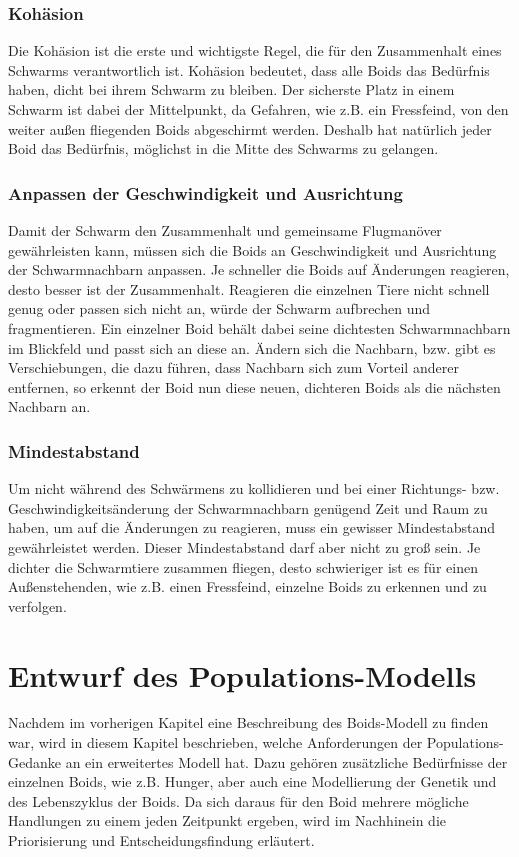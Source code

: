 \documentclass[draft=false
              ,paper=a4
              ,twoside=false
              ,fontsize=11pt
              ,headsepline
              ,BCOR10mm
              ,DIV11
              ,bibtotoc
              ,liststotoc
              ]{scrbook}
\begin{document}
\subsection{Kohäsion}
Die Kohäsion ist die erste und wichtigste Regel, die für den Zusammenhalt eines Schwarms verantwortlich ist. Kohäsion bedeutet, dass alle Boids das Bedürfnis haben, dicht bei ihrem Schwarm zu bleiben. Der sicherste Platz in einem Schwarm ist dabei der Mittelpunkt, da Gefahren, wie z.B. ein Fressfeind, von den weiter außen fliegenden Boids abgeschirmt werden. Deshalb hat natürlich jeder Boid das Bedürfnis, möglichst in die Mitte des Schwarms zu gelangen.
\subsection{Anpassen der Geschwindigkeit und Ausrichtung}
Damit der Schwarm den Zusammenhalt und gemeinsame Flugmanöver gewährleisten kann, müssen sich die Boids an Geschwindigkeit und Ausrichtung der Schwarmnachbarn anpassen. Je schneller die Boids auf Änderungen reagieren, desto besser ist der Zusammenhalt. Reagieren die einzelnen Tiere nicht schnell genug oder passen sich nicht an, würde der Schwarm aufbrechen und fragmentieren. Ein einzelner Boid behält dabei seine dichtesten Schwarmnachbarn im Blickfeld und passt sich an diese an. Ändern sich die Nachbarn, bzw. gibt es Verschiebungen, die dazu führen, dass Nachbarn sich zum Vorteil anderer entfernen, so erkennt der Boid nun diese neuen, dichteren Boids als die nächsten Nachbarn an.
\subsection{Mindestabstand}
Um nicht während des Schwärmens zu kollidieren und bei einer Richtungs- bzw. Geschwindigkeitsänderung der Schwarmnachbarn genügend Zeit und Raum zu haben, um auf die Änderungen zu reagieren, muss ein gewisser Mindestabstand gewährleistet werden. Dieser Mindestabstand darf aber nicht zu groß sein. Je dichter die Schwarmtiere zusammen fliegen, desto schwieriger ist es für einen Außenstehenden, wie z.B. einen Fressfeind, einzelne Boids zu erkennen und zu verfolgen.

\chapter{Entwurf des Populations-Modells}\label{modell}
Nachdem im vorherigen Kapitel eine Beschreibung des Boids-Modell zu finden war, wird in diesem Kapitel beschrieben, welche Anforderungen der Populations-Gedanke an ein erweitertes Modell hat. Dazu gehören zusätzliche Bedürfnisse der einzelnen Boids, wie z.B. Hunger, aber auch eine Modellierung der Genetik und des Lebenszyklus der Boids. Da sich daraus für den Boid mehrere mögliche Handlungen zu einem jeden Zeitpunkt ergeben, wird im Nachhinein die Priorisierung und Entscheidungsfindung erläutert.
\end{document}
